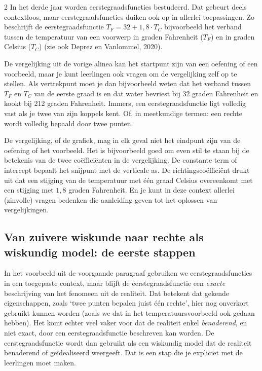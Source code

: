 \begin{multicols}{2}
In het derde jaar worden eerstegraadsfuncties bestudeerd. Dat gebeurt deels contextloos, maar eerstegraadsfuncties duiken ook op in allerlei toepassingen. Zo beschrijft de eerstegraadsfunctie $T_F=32+1,8 \cdot T_C$ bijvoorbeeld het verband tussen de temperatuur van een voorwerp in graden Fahrenheit ($T_F$) en in graden Celsius ($T_C$) (zie ook Deprez en Vanlommel, 2020).

De vergelijking uit de vorige alinea kan het startpunt zijn van een oefening of een voorbeeld, maar je kunt leerlingen ook vragen om de vergelijking zelf op te stellen. Als vertrekpunt moet je dan bijvoorbeeld weten dat het verband tussen $T_F$ en $T_C$ van de eerste graad is en dat water bevriest bij 32 graden Fahrenheit en kookt bij 212 graden Fahrenheit. Immers, een eerstegraadsfunctie ligt volledig vast als je twee van zijn koppels kent. Of, in meetkundige termen: een rechte wordt volledig bepaald door twee punten.

De vergelijking, of de grafiek, mag in elk geval niet het eindpunt zijn van de oefening of het voorbeeld. Het is bijvoorbeeld goed om even stil te staan bij de betekenis van de twee coëfficiënten in de vergelijking. De constante term of intercept bepaalt het snijpunt met de verticale as. De richtingscoëfficiënt drukt uit dat een stijging van de temperatuur met één graad Celsius overeenkomt met een stijging met $1,8$ graden Fahrenheit. En je kunt in deze context allerlei (zinvolle) vragen bedenken die aanleiding geven tot het oplossen van vergelijkingen.

   \subsection{Van zuivere wiskunde naar rechte als wiskundig model: de eerste stappen}

In het voorbeeld uit de voorgaande paragraaf gebruiken we eerstegraadsfuncties in een toegepaste context, maar blijft de eerstegraadsfunctie een \emph{exacte} beschrijving van het fenomeen uit de realiteit. Dat betekent dat gekende eigenschappen, zoals ‘twee punten bepalen juist één rechte’, hier nog onverkort gebruikt kunnen worden (zoals we dat in het temperatuursvoorbeeld ook gedaan hebben). Het komt echter veel vaker voor dat de realiteit enkel \emph{benaderend}, en niet exact, door een eerstegraadsfunctie beschreven kan worden. De eerstegraadsfunctie wordt dan gebruikt als een wiskundig model dat de realiteit benaderend of geïdealiseerd weergeeft. Dat is een stap die je expliciet met de leerlingen moet maken.


\end{multicols}
